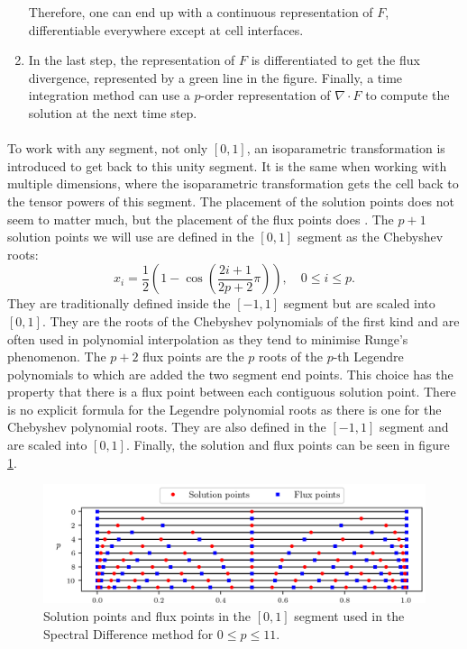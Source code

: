 \begin{enumerate}
        Therefore, one can end up with a continuous representation of $F$, differentiable everywhere except at cell interfaces.
        \item In the last step, the representation of $F$ is differentiated to get the flux divergence, represented by a green line in the figure.
        Finally, a time integration method can use a $p$-order representation of $\nabla \cdot F$ to compute the solution at the next time step.
      \end{enumerate}

      \paragraph{}
      To work with any segment, not only $\left[0, 1\right]$, an isoparametric transformation is introduced to get back to this unity segment.
      It is the same when working with multiple dimensions, where the isoparametric transformation gets the cell back to the tensor powers of this segment.
      The placement of the solution points does not seem to matter much, but the placement of the flux points does \cite{VandenAbeeleLacorWang2008}.
      The $p + 1$ solution points we will use are defined in the $\left[0, 1\right]$ segment as the Chebyshev roots:
      \begin{equation}
        x_i = \frac{1}{2} \left(1 - \cos\left(\frac{2i + 1}{2p + 2} \pi\right)\right), \quad 0 \leq i \leq p .
      \end{equation}
      They are traditionally defined inside the $\left[-1, 1\right]$ segment but are scaled into $\left[0, 1\right]$.
      They are the roots of the Chebyshev polynomials of the first kind and are often used in polynomial interpolation as they tend to minimise Runge's phenomenon.
      The $p + 2$ flux points are the $p$ roots of the $p$-th Legendre polynomials to which are added the two segment end points.
      This choice has the property that there is a flux point between each contiguous solution point.
      There is no explicit formula for the Legendre polynomial roots as there is one for the Chebyshev polynomial roots.
      They are also defined in the $\left[-1, 1\right]$ segment and are scaled into $\left[0, 1\right]$.
      Finally, the solution and flux points can be seen in figure \ref{fig:sd_points}.

      \begin{figure}
        \centering
        \includegraphics{figures/sd_points.png}
        \caption{Solution points and flux points in the $\left[0, 1\right]$ segment used in the Spectral Difference method for $0 \leq p \leq 11$.}
        \label{fig:sd_points}
      \end{figure}

